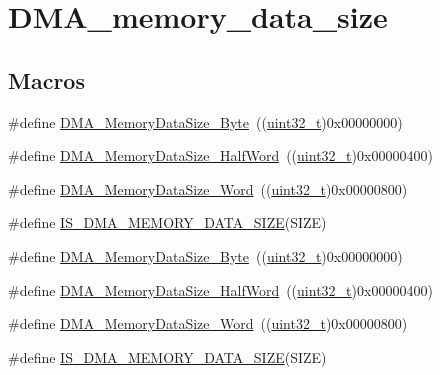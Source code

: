 \hypertarget{group___d_m_a__memory__data__size}{}\section{D\+M\+A\+\_\+memory\+\_\+data\+\_\+size}
\label{group___d_m_a__memory__data__size}
\subsection*{Macros}
\begin{DoxyCompactItemize}
\item 
\#define \hyperlink{group___d_m_a__memory__data__size_gad6093bccb60ff9adf81e21c73c58ba17}{D\+M\+A\+\_\+\+Memory\+Data\+Size\+\_\+\+Byte}~((\hyperlink{_p_e___types_8h_a33594304e786b158f3fb30289278f5af}{uint32\+\_\+t})0x00000000)
\item 
\#define \hyperlink{group___d_m_a__memory__data__size_ga74c9b4e547f5eaaf35d4fd3d01ed5741}{D\+M\+A\+\_\+\+Memory\+Data\+Size\+\_\+\+Half\+Word}~((\hyperlink{_p_e___types_8h_a33594304e786b158f3fb30289278f5af}{uint32\+\_\+t})0x00000400)
\item 
\#define \hyperlink{group___d_m_a__memory__data__size_gaff403722a6f82d4b34c9ef306507bb98}{D\+M\+A\+\_\+\+Memory\+Data\+Size\+\_\+\+Word}~((\hyperlink{_p_e___types_8h_a33594304e786b158f3fb30289278f5af}{uint32\+\_\+t})0x00000800)
\item 
\#define \hyperlink{group___d_m_a__memory__data__size_gac9e3748cebcb16d4ae4206d562bc804c}{I\+S\+\_\+\+D\+M\+A\+\_\+\+M\+E\+M\+O\+R\+Y\+\_\+\+D\+A\+T\+A\+\_\+\+S\+I\+ZE}(S\+I\+ZE)
\item 
\#define \hyperlink{group___d_m_a__memory__data__size_gad6093bccb60ff9adf81e21c73c58ba17}{D\+M\+A\+\_\+\+Memory\+Data\+Size\+\_\+\+Byte}~((\hyperlink{_p_e___types_8h_a33594304e786b158f3fb30289278f5af}{uint32\+\_\+t})0x00000000)
\item 
\#define \hyperlink{group___d_m_a__memory__data__size_ga74c9b4e547f5eaaf35d4fd3d01ed5741}{D\+M\+A\+\_\+\+Memory\+Data\+Size\+\_\+\+Half\+Word}~((\hyperlink{_p_e___types_8h_a33594304e786b158f3fb30289278f5af}{uint32\+\_\+t})0x00000400)
\item 
\#define \hyperlink{group___d_m_a__memory__data__size_gaff403722a6f82d4b34c9ef306507bb98}{D\+M\+A\+\_\+\+Memory\+Data\+Size\+\_\+\+Word}~((\hyperlink{_p_e___types_8h_a33594304e786b158f3fb30289278f5af}{uint32\+\_\+t})0x00000800)
\item 
\#define \hyperlink{group___d_m_a__memory__data__size_gac9e3748cebcb16d4ae4206d562bc804c}{I\+S\+\_\+\+D\+M\+A\+\_\+\+M\+E\+M\+O\+R\+Y\+\_\+\+D\+A\+T\+A\+\_\+\+S\+I\+ZE}(S\+I\+ZE)
\end{DoxyCompactItemize}


